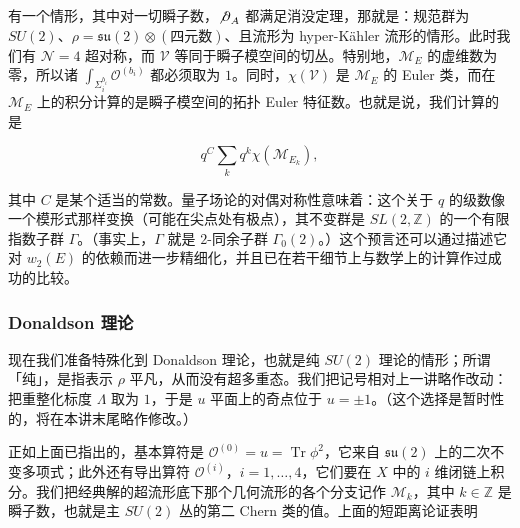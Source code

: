 
有一个情形，其中对一切瞬子数，${\not\partial}_A$ 都满足消没定理，那就是：规范群为 $SU(2)$、$\rho=\mathfrak{su}(2)\otimes(\text{四元数})$、且流形为 hyper-Kähler 流形的情形。此时我们有 $\mathcal{N}=4$ 超对称，而 $\mathcal V$ 等同于瞬子模空间的切丛。特别地，$\mathcal M_E$ 的虚维数为零，所以诸 $\int_{\Sigma_i^{b_i}}\mathcal O^{(b_i)}$ 都必须取为 $1$。同时，$\chi(\mathcal V)$ 是 $\mathcal M_E$ 的 Euler 类，而在 $\mathcal M_E$ 上的积分计算的是瞬子模空间的拓扑 Euler 特征数。也就是说，我们计算的是

\[
  q^{C}\sum_k q^k\chi(\mathcal M_{E_k}),
\]

其中 $C$ 是某个适当的常数。量子场论的对偶对称性意味着：这个关于 $q$ 的级数像一个模形式那样变换（可能在尖点处有极点），其不变群是 $SL(2,\mathbb{Z})$ 的一个有限指数子群 $\Gamma$。（事实上，$\Gamma$ 就是 $2$-同余子群 $\Gamma_0(2)$。）这个预言还可以通过描述它对 $w_2(E)$ 的依赖而进一步精细化，并且已在若干细节上与数学上的计算作过成功的比较。


\subsubsection{Donaldson 理论}

现在我们准备特殊化到 Donaldson 理论，也就是纯 $SU(2)$ 理论的情形；所谓「纯」，是指表示 $\rho$ 平凡，从而没有超多重态。我们把记号相对上一讲略作改动：把重整化标度 $\Lambda$ 取为 $1$，于是 $u$ 平面上的奇点位于 $u=\pm1$。（这个选择是暂时性的，将在本讲末尾略作修改。）

正如上面已指出的，基本算符是 $\mathcal O^{(0)}=u=\operatorname{Tr}\phi^2$，它来自 $\mathfrak{su}(2)$ 上的二次不变多项式；此外还有导出算符 $\mathcal O^{(i)}$，$i=1,\ldots,4$，它们要在 $X$ 中的 $i$ 维闭链上积分。我们把经典解的超流形底下那个几何流形的各个分支记作 $\mathcal M_k$，其中 $k\in\mathbb{Z}$ 是瞬子数，也就是主 $SU(2)$ 丛的第二 Chern 类的值。上面的短距离论证表明


